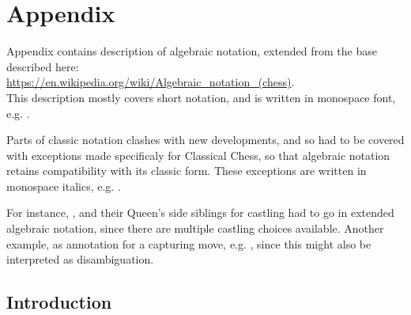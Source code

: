 

\chapter*{Appendix}
\label{ch:Appendix}

Appendix contains description of algebraic notation, extended from the base described here: \\
\href{https://en.wikipedia.org/wiki/Algebraic\_notation\_(chess)}{https://en.wikipedia.org/wiki/Algebraic\_notation\_(chess)}. \\
This description mostly covers short notation, and is written in monospace font, e.g. .

Parts of classic notation clashes with new developments, and so had to be covered with
exceptions made specificaly for Classical Chess, so that algebraic notation retains
compatibility with its classic form. These exceptions are written in monospace italics,
e.g. .

For instance, ,  and their Queen's side siblings for castling had
to go in extended algebraic notation, since there are multiple castling choices available.
Another example,  as annotation for a capturing move, e.g. , since
this might also be interpreted as disambiguation.

\clearpage %

\section*{Introduction}
\label{sec:Appendix/Introduction}

